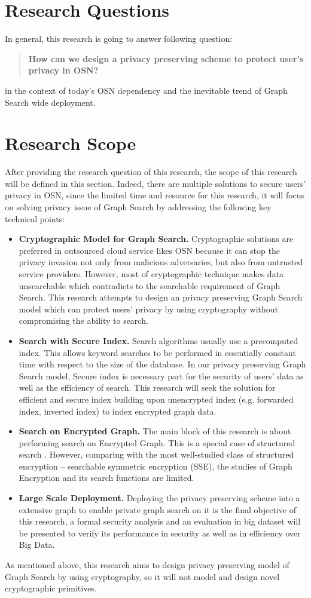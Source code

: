 \section{Research Questions}
In general, this research is going to answer following question:
\begin{quotation}
{ \bf How can we design a privacy preserving scheme to protect user's privacy in OSN?}
\end{quotation}
in the context of today's OSN dependency and the inevitable trend of Graph Search wide deployment.

\section{Research Scope}
After providing the research question of this research, the scope of this research will be defined in this section. Indeed, there are multiple solutions to secure users' privacy in OSN, since the limited time and resource for this research, it will focus on solving privacy issue of Graph Search by addressing the following key technical points:
\begin{itemize}
\setlength{\itemsep}{0pt}
\item{\bf Cryptographic Model for Graph Search.} Cryptographic solutions are preferred in outsourced cloud service likes OSN because it can stop the privacy invasion not only from malicious adversaries, but also from untrusted service providers. However, most of cryptographic technique makes data unsearchable which contradicts to the searchable requirement of Graph Search. This research attempts to design an privacy preserving Graph Search model which can protect users' privacy by using cryptography without compromising the ability to search.
\item{\bf Search with Secure Index.} Search algorithms usually use a precomputed index. This allows keyword searches to be performed in essentially constant time with respect to the size of the database. In our privacy preserving Graph Search model, Secure index is necessary part for the security of users' data as well as the efficiency of search. This research will seek the solution for efficient and secure index building upon unencrypted index (e.g. forwarded index, inverted index) to index encrypted graph data.
\item{\bf Search on Encrypted Graph.} The main block of this research is about performing search on Encrypted Graph. This is a special case of structured search \cite{chase2010structured}. However, comparing with the most well-studied class of structured encryption -- searchable symmetric encryption (SSE), the studies of Graph Encryption and its search functions are limited.
\item {\bf Large Scale Deployment.} Deploying the privacy preserving scheme into a extensive graph to enable private graph search on it is the final objective of this research, a formal security analysis and an evaluation in big dataset will be presented to verify its performance in security as well as in efficiency over Big Data. 
\end{itemize}

As mentioned above, this research aims to design privacy preserving model of Graph Search by using cryptography, so it will not model and design novel cryptographic primitives. 












